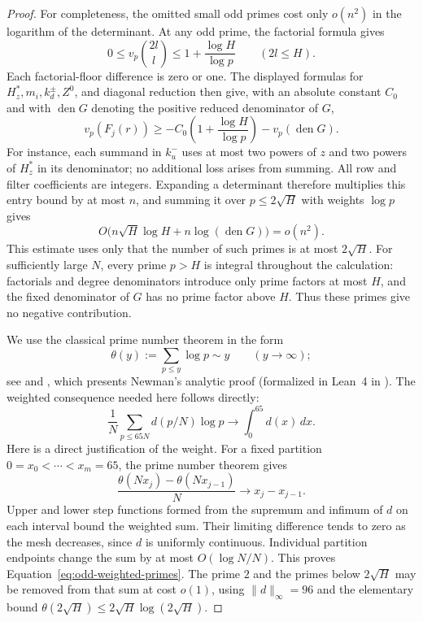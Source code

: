 \begin{proof}
For completeness, the omitted small odd primes cost only $o(n^2)$
in the logarithm of the determinant.  At any odd prime, the factorial
formula gives
\[
 0\le v_p\binom{2l}{l}\le1+\frac{\log H}{\log p}
 \qquad(2l\le H).
\]
Each factorial-floor difference is zero or one.  The displayed
formulas for $H_z^*,m_i,k_d^\pm,Z^0$, and diagonal reduction then
give, with an absolute constant $C_0$ and with
$\operatorname{den}G$ denoting the positive reduced denominator of $G$,
\[
 v_p(F_j(r))\ge
   -C_0\left(1+\frac{\log H}{\log p}\right)-v_p(\operatorname{den}G).
\]
For instance, each summand in $k^-_u$ uses at most two powers of
$z$ and two powers of $H_z^*$ in its denominator; no additional
loss arises from summing.  All row and filter coefficients are
integers.  Expanding a determinant therefore multiplies this entry
bound by at most $n$, and summing it over $p\le2\sqrt H$ with
weights $\log p$ gives
\[
 O\bigl(n\sqrt H\log H+n\log(\operatorname{den}G)\bigr)
       =o(n^2).
\]
This estimate uses only that the number of such primes is at most
$2\sqrt H$.  For sufficiently large $N$, every prime $p>H$ is
integral throughout the calculation: factorials and degree
denominators introduce only prime factors at most $H$, and the fixed
denominator of $G$ has no prime factor above $H$.  Thus these primes
give no negative contribution.

We use the classical prime number theorem in the form
\[
 \theta(y):=\sum_{p\le y}\log p\sim y
       \qquad(y\to\infty);
\]
see \cite{Hadamard1896,delaValleePoussin1896,Newman1980} and
\cite[Step~VI, p.~707]{Zagier1997}, which presents Newman's analytic
proof (formalized in Lean~4 in \cite{KontorovichTao2024PNT}). The weighted consequence needed here follows directly:
\begin{equation}\label{eq:odd-weighted-primes}
 \frac1N\sum_{p\le65N}d(p/N)\log p
       \longrightarrow\int_0^{65}d(x)\,dx.
\end{equation}
Here is a direct justification of the weight.  For a fixed partition
$0=x_0<\cdots<x_m=65$, the prime number theorem gives
\[
 \frac{\theta(Nx_j)-\theta(Nx_{j-1})}{N}
       \longrightarrow x_j-x_{j-1}.
\]
Upper and lower step functions formed from the supremum and infimum
of $d$ on each interval bound the weighted sum.  Their limiting
difference tends to zero as the mesh decreases, since $d$ is
uniformly continuous.  Individual partition endpoints change the
sum by at most $O(\log N/N)$.  This proves
Equation~\eqref{eq:odd-weighted-primes}.  The prime $2$ and the
primes below $2\sqrt H$ may be removed from that sum at cost $o(1)$,
using $\|d\|_\infty=96$ and the elementary bound
$\theta(2\sqrt H)\le2\sqrt H\log(2\sqrt H)$.


\end{proof}
